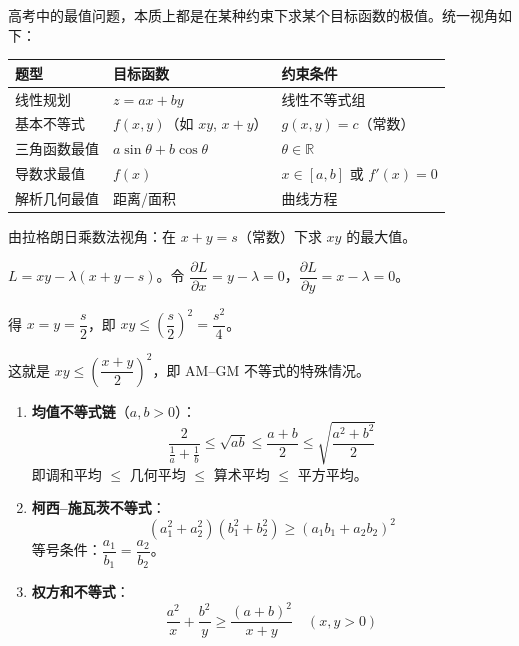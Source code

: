 \documentclass[12pt, a4paper]{ctexart}
\begin{document}
\begin{knowledgebox}[高考最值问题的统一框架]
高考中的最值问题，本质上都是在某种约束下求某个目标函数的极值。统一视角如下：

\begin{center}
\begin{tabular}{lll}
\toprule
\textbf{题型} & \textbf{目标函数} & \textbf{约束条件} \\
\midrule
线性规划 & $z = ax + by$ & 线性不等式组 \\
基本不等式 & $f(x,y)$（如 $xy$, $x+y$） & $g(x,y) = c$（常数） \\
三角函数最值 & $a\sin\theta + b\cos\theta$ & $\theta \in \mathbb{R}$ \\
导数求最值 & $f(x)$ & $x \in [a, b]$ 或 $f'(x) = 0$ \\
解析几何最值 & 距离/面积 & 曲线方程 \\
\bottomrule
\end{tabular}
\end{center}
\end{knowledgebox}

\begin{tipbox}[基本不等式的统一推导]
由拉格朗日乘数法视角：在 $x + y = s$（常数）下求 $xy$ 的最大值。

$L = xy - \lambda(x + y - s)$。令 $\dfrac{\partial L}{\partial x} = y - \lambda = 0$，$\dfrac{\partial L}{\partial y} = x - \lambda = 0$。

得 $x = y = \dfrac{s}{2}$，即 $xy \le \left(\dfrac{s}{2}\right)^2 = \dfrac{s^2}{4}$。

这就是 $xy \le \left(\dfrac{x+y}{2}\right)^2$，即 AM--GM 不等式的特殊情况。
\end{tipbox}

\begin{knowledgebox}[常用不等式工具箱]
\begin{enumerate}[label=(\arabic*)]
  \item \textbf{均值不等式链}（$a, b > 0$）：
  \[ \frac{2}{\frac{1}{a}+\frac{1}{b}} \le \sqrt{ab} \le \frac{a+b}{2} \le \sqrt{\frac{a^2+b^2}{2}} \]
  即调和平均 $\le$ 几何平均 $\le$ 算术平均 $\le$ 平方平均。

  \item \textbf{柯西--施瓦茨不等式}：
  \[ (a_1^2 + a_2^2)(b_1^2 + b_2^2) \ge (a_1 b_1 + a_2 b_2)^2 \]
  等号条件：$\dfrac{a_1}{b_1} = \dfrac{a_2}{b_2}$。

  \item \textbf{权方和不等式}：
  \[ \frac{a^2}{x} + \frac{b^2}{y} \ge \frac{(a+b)^2}{x+y} \quad (x, y > 0) \]
\end{enumerate}
\end{knowledgebox}
\end{document}
